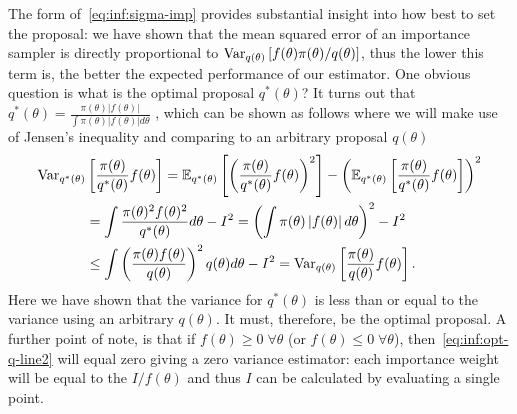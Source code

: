 The form of~\eqref{eq:inf:sigma-imp} provides substantial insight into how
best to set the proposal: we have shown that the mean squared error of an
importance sampler is directly proportional to $\mathrm{Var}_{q(\theta)} \left[f(\theta)\pi(\theta)/q(\theta)\right]$,
thus the lower this term is, the better the expected performance of our
estimator.  One obvious question is what is the optimal proposal $q^*(\theta)$?
It turns out that $q^*(\theta) = \frac{\pi(\theta)\left|f(\theta)\right|}
{\int \pi(\theta)\left|f(\theta)\right|d\theta}$
\citep{kahn1953methods,owen2013mc}, which can be
 shown as follows where we will make use of Jensen's inequality and comparing to an arbitrary
 proposal $q(\theta)$
\begin{align}
\mathrm{Var}_{q^*(\theta)} &\left[\frac{\pi(\theta)}{q^*(\theta)} f(\theta)\right] =
\mathbb{E}_{q^*(\theta)} \left[\left(\frac{\pi(\theta)}{q^*(\theta)} f(\theta)\right)^2\right]
-\left(\mathbb{E}_{q^*(\theta)} \left[\frac{\pi(\theta)}{q^*(\theta)} f(\theta)\right]\right)^2
\nonumber \\
 &= \int \frac{\pi(\theta)^2 f(\theta)^2}{q^*(\theta)} d\theta
 -I^2 
 = \left(\int \pi(\theta) \left|f(\theta)\right| d\theta\right)^2
 -I^2 \label{eq:inf:opt-q-line2}\\
 &\le \int \left(\frac{\pi(\theta) f(\theta)}{q(\theta)}\right)^2 q(\theta) d\theta
 -I^2 =\mathrm{Var}_{q(\theta)} \left[\frac{\pi(\theta)}{q(\theta)} f(\theta)\right] \label{eq:inf:opt-q}.
\end{align}
Here we have shown that the variance for $q^*(\theta)$ is less than or equal to the variance
using an arbitrary $q(\theta)$.  It must, therefore, be the optimal proposal.
A further point of note, is that if $f(\theta)\ge0 \; \forall \theta$ (or 
$f(\theta)\le0 \; \forall \theta$), 
then~\eqref{eq:inf:opt-q-line2} will equal zero giving a zero variance estimator:
each importance weight will be equal to the  $I/f(\theta)$ and thus $I$
can be calculated by evaluating a single point.  

